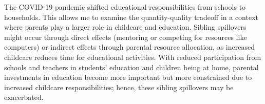 \documentclass[AER]{AEA}
\begin{document}
 


%
\maketitle
The COVID-19 pandemic shifted educational responsibilities from schools to households. This allows me to examine the quantity-quality tradeoff in a context where parents play a larger role in childcare and education. Sibling spillovers might occur through direct effects (mentoring or competing for resources like computers) or indirect effects through parental resource allocation, as increased childcare reduces time for educational activities. With reduced participation from schools and teachers in students’ education and children being at home, parental investments in education become more important but more constrained due to increased childcare responsibilities; hence, these sibling spillovers may be exacerbated. 
\end{document}
